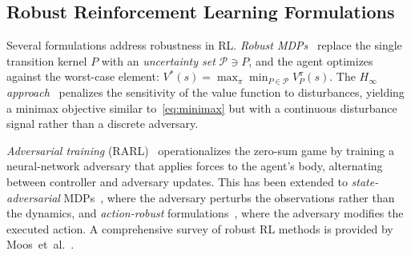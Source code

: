 \documentclass[conference]{IEEEtran}
\newcommand{\E}{\mathbb{E}}
\newcommand{\cP}{\mathcal{P}}
\begin{document}


\subsection{Robust Reinforcement Learning Formulations}\label{sec:bg_robust}

Several formulations address robustness in RL.
\emph{Robust MDPs}~\cite{iyengar2005robust, nilim2005robust} replace the
single transition kernel $P$ with an \emph{uncertainty set}
$\cP \ni P$, and the agent optimizes against the worst-case element:
$V^*(s) = \max_\pi \min_{P \in \cP} V^\pi_P(s)$.  The
\emph{$H_\infty$ approach}~\cite{morimoto2005robust} penalizes the
sensitivity of the value function to disturbances, yielding a minimax
objective similar to~\eqref{eq:minimax} but with a continuous disturbance
signal rather than a discrete adversary.

\emph{Adversarial training} (RARL)~\cite{pinto2017robust} operationalizes
the zero-sum game by training a neural-network adversary that applies
forces to the agent's body, alternating between controller and adversary
updates.  This has been extended to \emph{state-adversarial}
MDPs~\cite{zhang2020robust}, where the adversary perturbs the
observations rather than the dynamics, and \emph{action-robust}
formulations~\cite{tessler2019action}, where the adversary modifies the
executed action.  A comprehensive survey of robust RL methods is provided
by Moos~et~al.~\cite{moos2022robust}.
\end{document}
